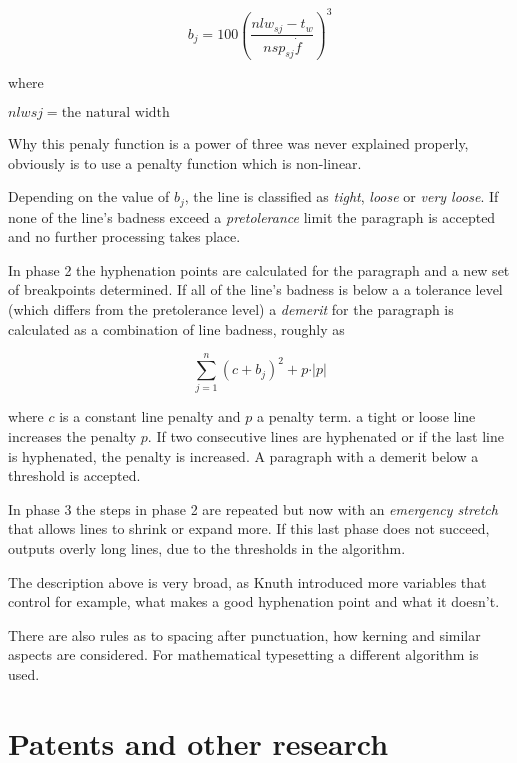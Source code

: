 {{\begin{description}
$$b_j=100\left(\frac{nlw_{sj}-t_w}{nsp_{sj}\dot f}\right)^{3}$$

where 

$nlw{sj} = \text{the natural width}$

Why this penaly function is a power of three was never explained properly, obviously is to use a penalty function which is non-linear. 

Depending on the value of $b_j$, the line is classified as \textit{tight}, \textit{loose} or  \textit{very loose}. If none of the line's badness exceed a \textit{pretolerance}  limit the paragraph is accepted and no further processing takes place.

\item[Phase 2] In phase 2 the hyphenation points are calculated for the paragraph and a new set of breakpoints  determined. If all of the line's badness is below a a tolerance level  (which differs from the pretolerance level) a \textit{demerit} for the paragraph is calculated as a combination of line badness, roughly as

\begin{equation}
\sum_{j=1}^{n}  \left(c+b_j \right)^{2} + p \cdot \vert p\vert 
\end{equation}

where $c$ is a constant line penalty and $p$ a penalty term. a tight or loose line increases the penalty $p$. If two consecutive lines are hyphenated or if the last line is hyphenated, the penalty is increased. A paragraph with a demerit below a threshold is accepted.

\item[Phase 3] In phase 3 the steps in phase 2 are repeated but now with an \textit{emergency stretch} that allows lines to shrink or expand more. If this last phase does not succeed, \tex outputs overly long lines, due to the thresholds in the algorithm.
\end{description}

The description above is very broad, as Knuth introduced more variables that control for example, what makes a good hyphenation point and what it doesn’t.

There are also rules as to spacing after punctuation, how kerning and similar aspects are considered.  For mathematical typesetting a different algorithm is used. 


\section{Patents and other research}

}}

